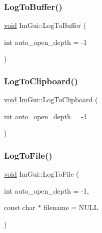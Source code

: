 \mbox{\label{namespaceImGui_a4dccd4d729cef38c0c542d433dc09480}} 
\subsubsection{\texorpdfstring{Log\+To\+Buffer()}{LogToBuffer()}}
{\footnotesize\ttfamily \hyperlink{imgui__impl__opengl3__loader_8h_ac668e7cffd9e2e9cfee428b9b2f34fa7}{void} Im\+Gui\+::\+Log\+To\+Buffer (\begin{DoxyParamCaption}\item[{int}]{auto\+\_\+open\+\_\+depth = {\ttfamily -\/1} }\end{DoxyParamCaption})}

\mbox{\label{namespaceImGui_a70e12f01ecb65747c9a70b73555b6ec1}} 
\subsubsection{\texorpdfstring{Log\+To\+Clipboard()}{LogToClipboard()}}
{\footnotesize\ttfamily \hyperlink{imgui__impl__opengl3__loader_8h_ac668e7cffd9e2e9cfee428b9b2f34fa7}{void} Im\+Gui\+::\+Log\+To\+Clipboard (\begin{DoxyParamCaption}\item[{int}]{auto\+\_\+open\+\_\+depth = {\ttfamily -\/1} }\end{DoxyParamCaption})}

\mbox{\label{namespaceImGui_a8feab4b22519bc5eae9754b0ad545d81}} 
\subsubsection{\texorpdfstring{Log\+To\+File()}{LogToFile()}}
{\footnotesize\ttfamily \hyperlink{imgui__impl__opengl3__loader_8h_ac668e7cffd9e2e9cfee428b9b2f34fa7}{void} Im\+Gui\+::\+Log\+To\+File (\begin{DoxyParamCaption}\item[{int}]{auto\+\_\+open\+\_\+depth = {\ttfamily -\/1},  }\item[{const char $\ast$}]{filename = {\ttfamily NULL} }\end{DoxyParamCaption})}

